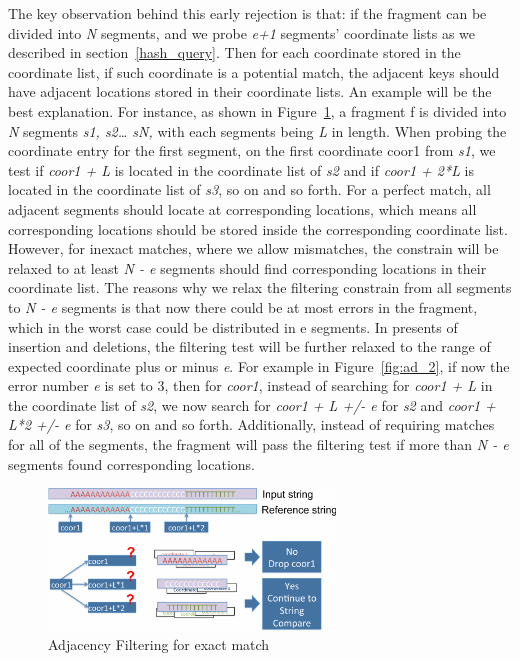 The key observation behind this early rejection is that: if the fragment can be
divided into \textit{N} segments, and we probe \textit{e+1} segments'
coordinate lists as we described in section~\ref{hash_query}. Then for each
coordinate stored in the coordinate list, if such coordinate is a potential
match, the adjacent keys should have adjacent locations stored in their
coordinate lists. An example will be the best explanation. For instance, as
shown in Figure~\ref{fig:ad_1}, a fragment f is divided into \textit{N}
segments \textit{s1, s2… sN,} with each segments being \textit{L} in length.
When probing the coordinate entry for the first segment, on the first
coordinate coor1 from \textit{s1}, we test if \textit{coor1 + L} is located in
the coordinate list of \textit{s2} and if \textit{coor1 + 2*L} is located in
the coordinate list of \textit{s3}, so on and so forth. For a perfect match,
all adjacent segments should locate at corresponding locations, which means all
corresponding locations should be stored inside the corresponding coordinate
list. However, for inexact matches, where we allow mismatches, the constrain
will be relaxed to at least \textit{N - e} segments should find corresponding
locations in their coordinate list. The reasons why we relax the filtering
constrain from all segments to \textit{N - e} segments is that now there could
be at most errors in the fragment, which in the worst case could be distributed
in e segments. In presents of insertion and deletions, the filtering test will
be further relaxed to the range of expected coordinate plus or minus
\textit{e}. For example in Figure~\ref{fig:ad_2}, if now the error
number \textit{e} is set to 3, then for \textit{coor1}, instead of searching
for \textit{coor1 + L} in the coordinate list of \textit{s2}, we now search for
\textit{coor1 + L +/- e} for \textit{s2} and \textit{coor1 + L*2 +/- e} for
\textit{s3}, so on and so forth. Additionally, instead of requiring matches for
all of the segments, the fragment will pass the filtering test if more than
\textit{N - e} segments found corresponding locations. \\

\begin{figure}[t] 
\centering
\vspace{0.1in}
\includegraphics[width=3in]{./figure/AD_1_B.pdf} \vspace{0in}
\caption{Adjacency Filtering for exact match}
\label{fig:ad_1} 
\end{figure}

